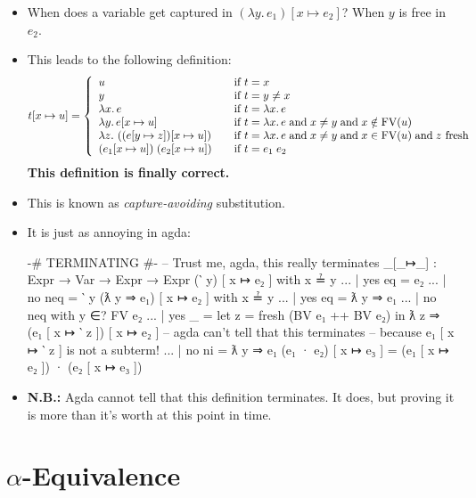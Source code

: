 \documentclass{lecturenotes}
\newcommand{\abs}[2]{\ensuremath{\lambda #1.\,#2}}
\newcommand{\app}[2]{\ensuremath{#1\;#2}}
\newcommand{\FV}{\text{FV}}
\begin{document}
\begin{itemize}
\item When does a variable get captured in $(\abs{y}{e_1}) [x \mapsto e_2]$? When $y$ is free in $e_2$.
\item This leads to the following definition:
  $$
  t[x \mapsto u] = \left\{
    \begin{array}{l@{\hspace{2em}\text{if}~}l}
      u & t = x \\
      y & t = y \neq x\\
      \abs{x}{e} & t = \abs{x}{e}\\
      \abs{y}{e[x\mapsto u]} & t = \abs{x}{e} \mathrel{\text{and}} x \neq y \mathrel{\text{and}} x \notin \FV(u)\\
      \abs{z}{\left((e[y \mapsto z])[x \mapsto u]\right)} & t = \abs{x}{e} \mathrel{\text{and}} x \neq y \mathrel{\text{and}} x \in \FV(u) \mathrel{\text{and}} z~\text{fresh}\\
      \app{(e_1[x\mapsto u])}{(e_2[x \mapsto u])} & t = \app{e_1}{e_2}
    \end{array}\right.
  $$
  \textbf{This definition is finally correct.}
\item This is known as \emph{capture-avoiding} substitution.
\item It is just as annoying in agda:
\begin{code}
{-# TERMINATING #-} -- Trust me, agda, this really terminates
_[_↦_] : Expr → Var → Expr → Expr
(‵ y) [ x ↦ e₂ ] with x ≟ y
... | yes eq = e₂
... | no neq = ‵ y
(ƛ y ⇒ e₁) [ x ↦ e₂ ] with x ≟ y
... | yes eq = ƛ y ⇒ e₁
... | no neq with y ∈? FV e₂
... | yes _ =
  let z = fresh (BV e₁ ++ BV e₂)
  in ƛ z ⇒ (e₁ [ x ↦ ‵ z ]) [ x ↦ e₂ ] -- agda can't tell that this terminates
                                       -- because e₁ [ x ↦ ‵ z ] is not a subterm!
... | no ni = ƛ y ⇒ e₁ 
(e₁ · e₂) [ x ↦ e₃ ] = (e₁ [ x ↦ e₂ ]) · (e₂ [ x ↦ e₃ ])    
\end{code}
\item \textbf{N.B.:} Agda cannot tell that this definition terminates.
  It does, but proving it is more than it's worth at this point in time.
\end{itemize}

\section{$\alpha$-Equivalence}
\label{sec:alpha-equivalence}
\end{document}
